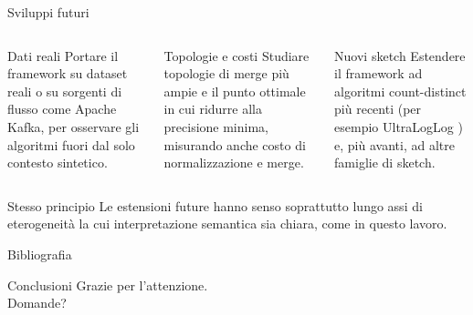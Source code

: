 \documentclass[aspectratio=169,11pt]{beamer}
\begin{document}
\begin{frame}{Sviluppi futuri}
  \begin{columns}[T,onlytextwidth]
      \begin{block}{Dati reali}
        \footnotesize
        Portare il framework su dataset reali o su sorgenti di flusso come
        Apache Kafka, per osservare gli algoritmi fuori dal solo contesto sintetico.
      \end{block}
      \begin{block}{Topologie e costi}
        \footnotesize
        Studiare topologie di merge pi\`u ampie e il punto ottimale in cui
        ridurre alla precisione minima, misurando anche costo di normalizzazione e merge.
      \end{block}
      \begin{block}{Nuovi sketch}
        \footnotesize
        Estendere il framework ad algoritmi count-distinct pi\`u recenti
        (per esempio UltraLogLog \cite{Ertl_2024_UltraLogLog}) e, pi\`u avanti,
        ad altre famiglie di sketch.
      \end{block}
  \end{columns}

  \vspace{0.12cm}

  \begin{block}{Stesso principio}
    \footnotesize
    Le estensioni future hanno senso soprattutto lungo assi di eterogeneit\`a la
    cui interpretazione semantica sia chiara, come in questo lavoro.
  \end{block}
\end{frame}

\begin{frame}[allowframebreaks]{Bibliografia}
  \scriptsize
  
  
\end{frame}

\begin{frame}{Conclusioni}
  Grazie per l'attenzione. \\
  Domande?
\end{frame}
\end{document}
